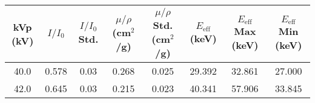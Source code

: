 \begin{tabular}{cccccccc}
\toprule
 kVp (kV) &  $I/I_0$ &  $I/I_0$ Std. &  $\mu/\rho$ (cm$^2$/g) &  $\mu/\rho$ Std. (cm$^2$/g) &  $E_{\text{eff}}$ (keV) &  $E_{\text{eff}}$ Max (keV) &  $E_{\text{eff}}$ Min (keV) \\
\midrule
     40.0 &    0.578 &          0.03 &                  0.268 &                       0.025 &                  29.392 &                      32.861 &                      27.000 \\
     42.0 &    0.645 &          0.03 &                  0.215 &                       0.023 &                  40.341 &                      57.906 &                      33.845 \\
\bottomrule
\end{tabular}

